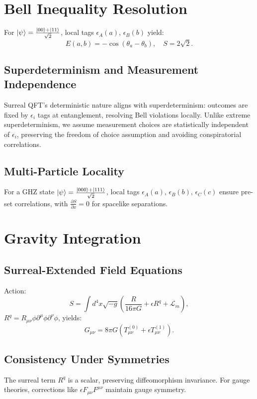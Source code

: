 \documentclass{article}
\begin{document}
\section{Bell Inequality Resolution}
For \(\ket{\psi} = \frac{\ket{00} + \ket{11}}{\sqrt{2}}\), local tags \(\epsilon_A(a)\), \(\epsilon_B(b)\) yield:
\begin{equation}
E(a,b) = -\cos(\theta_a - \theta_b), \quad S = 2\sqrt{2}.
\end{equation}

\subsection{Superdeterminism and Measurement Independence}
Surreal QFT’s deterministic nature aligns with superdeterminism: outcomes are fixed by \(\epsilon_i\) tags at entanglement, resolving Bell violations locally. Unlike extreme superdeterminism, we assume measurement choices are statistically independent of \(\epsilon_i\), preserving the freedom of choice assumption and avoiding conspiratorial correlations.

\subsection{Multi-Particle Locality}
For a GHZ state \(\ket{\psi} = \frac{\ket{000} + \ket{111}}{\sqrt{2}}\), local tags \(\epsilon_A(a)\), \(\epsilon_B(b)\), \(\epsilon_C(c)\) ensure pre-set correlations, with \(\frac{\partial S}{\partial x} = 0\) for spacelike separations.

\section{Gravity Integration}
\subsection{Surreal-Extended Field Equations}
Action:
\begin{equation}
S = \int d^4x \sqrt{-g} \left( \frac{R}{16\pi G} + \epsilon R^q + \mathcal{L}_m \right),
\end{equation}
\(R^q = R_{\mu\nu} \phi \partial^\mu \phi \partial^\nu \phi\), yields:
\begin{equation}
G_{\mu\nu} = 8\pi G \left( T_{\mu\nu}^{(0)} + \epsilon T_{\mu\nu}^{(1)} \right).
\end{equation}

\subsection{Consistency Under Symmetries}
The surreal term \(R^q\) is a scalar, preserving diffeomorphism invariance. For gauge theories, corrections like \(\epsilon F_{\mu\nu} F^{\mu\nu}\) maintain gauge symmetry.
\end{document}
